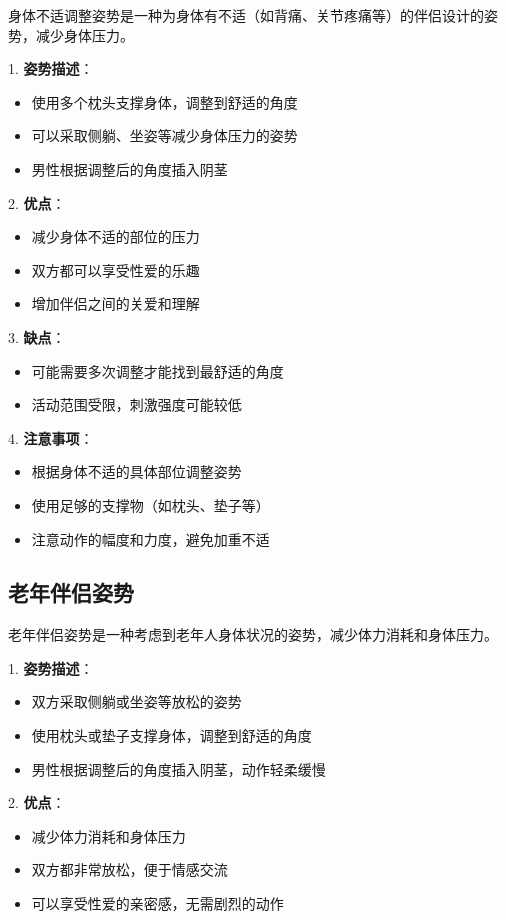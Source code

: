 \documentclass[12pt,UTF8]{ctexbook}
\begin{document}
身体不适调整姿势是一种为身体有不适（如背痛、关节疼痛等）的伴侣设计的姿势，减少身体压力。

1. \textbf{姿势描述}：
  \begin{itemize}
  \item 使用多个枕头支撑身体，调整到舒适的角度
  \item 可以采取侧躺、坐姿等减少身体压力的姿势
  \item 男性根据调整后的角度插入阴茎
  \end{itemize}

2. \textbf{优点}：
  \begin{itemize}
  \item 减少身体不适的部位的压力
  \item 双方都可以享受性爱的乐趣
  \item 增加伴侣之间的关爱和理解
  \end{itemize}

3. \textbf{缺点}：
  \begin{itemize}
  \item 可能需要多次调整才能找到最舒适的角度
  \item 活动范围受限，刺激强度可能较低
  \end{itemize}

4. \textbf{注意事项}：
  \begin{itemize}
  \item 根据身体不适的具体部位调整姿势
  \item 使用足够的支撑物（如枕头、垫子等）
  \item 注意动作的幅度和力度，避免加重不适
  \end{itemize}

\subsection{老年伴侣姿势}

老年伴侣姿势是一种考虑到老年人身体状况的姿势，减少体力消耗和身体压力。

1. \textbf{姿势描述}：
  \begin{itemize}
  \item 双方采取侧躺或坐姿等放松的姿势
  \item 使用枕头或垫子支撑身体，调整到舒适的角度
  \item 男性根据调整后的角度插入阴茎，动作轻柔缓慢
  \end{itemize}

2. \textbf{优点}：
  \begin{itemize}
  \item 减少体力消耗和身体压力
  \item 双方都非常放松，便于情感交流
  \item 可以享受性爱的亲密感，无需剧烈的动作
  \end{itemize}
\end{document}
